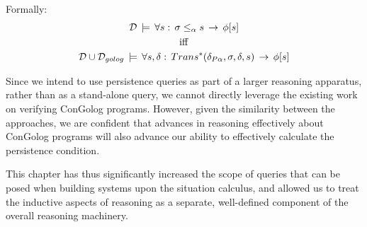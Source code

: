 Formally:\begin{gather*}
\mathcal{D}\,\models\,\forall s:\,\sigma\leq_{\alpha}s\,\rightarrow\,\phi[s]\\
\mathrm{iff}\\
\mathcal{D}\cup\mathcal{D}_{golog}\,\models\,\forall s,\delta:\, Trans^{*}(\delta_{P\alpha},\sigma,\delta,s)\,\rightarrow\,\phi[s]\end{gather*}


Since we intend to use persistence queries as part of a larger reasoning
apparatus, rather than as a stand-alone query, we cannot directly
leverage the existing work on verifying ConGolog programs. However,
given the similarity between the approaches, we are confident that
advances in reasoning effectively about ConGolog programs will also
advance our ability to effectively calculate the persistence condition.

This chapter has thus significantly increased the scope of queries
that can be posed when building systems upon the situation calculus,
and allowed us to treat the inductive aspects of reasoning as a separate,
well-defined component of the overall reasoning machinery.

